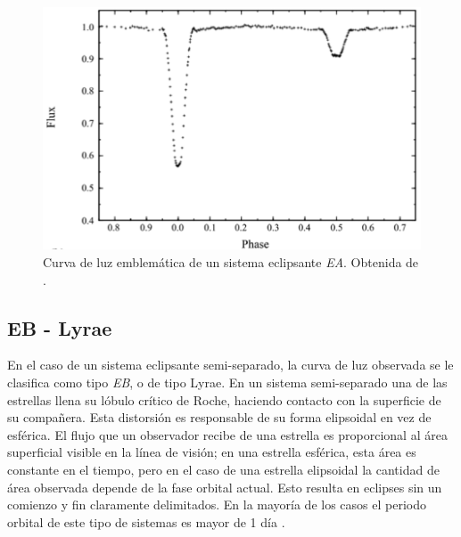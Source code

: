 \begin{figure}[!ht]
	\centering
	\includegraphics[scale=0.6]{Introduccion/Figures/Figura EA Curva_Modelling of WUMa Stars.png}
	\caption{Curva de luz emblemática de un sistema eclipsante
	\textit{EA}. Obtenida de
	\autocite{skelton_modelling_wuma_variable_stars_2009}.}
	\label{figuraEACurvaLuz}
\end{figure}

\subsection{EB - \textbeta \space Lyrae}

En el caso de un sistema eclipsante semi-separado, la curva de luz observada se
le clasifica como tipo \textit{EB}, o de tipo \textbeta \space Lyrae. En un sistema
semi-separado una de las estrellas llena su lóbulo crítico de Roche, haciendo
contacto con la superficie de su compañera. Esta distorsión es responsable de su
forma elipsoidal en vez de esférica. El flujo que un observador recibe de una
estrella es proporcional al área superficial visible en la línea de visión; en
una estrella esférica, esta área es constante en el tiempo, pero en el caso de
una estrella elipsoidal la cantidad de área observada depende de la fase orbital
actual. Esto resulta en eclipses sin un comienzo y fin claramente delimitados.
En la mayoría de los casos el periodo orbital de este tipo de sistemas es mayor
de 1 día \autocite{samus_gcvs_variable_types_2016}. 

